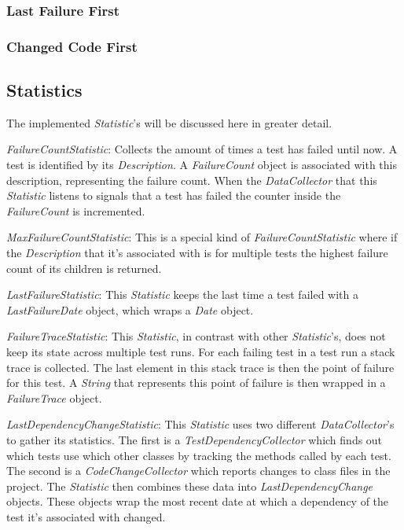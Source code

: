 \documentclass[i2]{oss}
\newcommand{\class}[1]{\emph{#1}}
\begin{document}
\subsubsection{Last Failure First}



\subsubsection{Changed Code First}


\subsection{Statistics}
\label{subssec: statistics}

The implemented \class{Statistic}'s will be discussed here in greater 
detail.
\begin{description}
\item \class{FailureCountStatistic}: Collects the amount of times a test 
has failed until now.
A test is identified by its \class{Description}.
A \class{FailureCount} object is associated with this description,
representing the failure count.
When the \class{DataCollector} that this \class{Statistic} listens to
signals that a test has failed the counter inside the 
\class{FailureCount} is incremented.
\item \class{MaxFailureCountStatistic}: This is a special kind of 
\class{FailureCountStatistic} where if the \class{Description} that it's
associated with is for multiple tests the highest failure count of its 
children is returned.
\item \class{LastFailureStatistic}: This \class{Statistic} keeps the 
last time a test failed with a \class{LastFailureDate} object, which
wraps a \class{Date} object.
\item \class{FailureTraceStatistic}: This \class{Statistic}, in contrast
with other \class{Statistic}'s, does not keep its state across multiple
test runs.
For each failing test in a test run a stack trace is collected. 
The last element in this stack trace is then the point of failure for 
this test.
A \class{String} that represents this point of failure is then wrapped
in a \class{FailureTrace} object.
\item \class{LastDependencyChangeStatistic}: This \class{Statistic} uses
two different \class{DataCollector}'s to gather its statistics.
The first is a \class{TestDependencyCollector} which finds out which 
tests use which other classes by tracking the methods called by each
test.
The second is a \class{CodeChangeCollector} which reports changes to
class files in the project.
The \class{Statistic} then combines these data into 
\class{LastDependencyChange} objects.
These objects wrap the most recent date at which a dependency of the 
test it's associated with changed.
\end{description}
\end{document}
